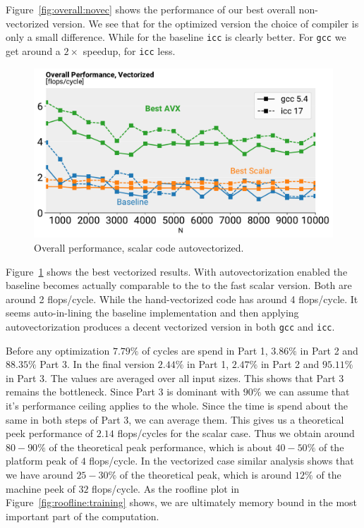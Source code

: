 \documentclass[letterpaper]{article}
\begin{document}
Figure~\ref{fig:overall:novec} shows the performance of our best overall non-vectorized version. We see that for the optimized version the choice of compiler is only a small difference. While for the baseline \texttt{icc} is clearly better. For \texttt{gcc} we get around a $2 \times$ speedup, for \texttt{icc} less.

\begin{figure}[h]
  \includegraphics[width=\linewidth]{images/overall_vec}
  \caption{Overall performance, scalar code autovectorized.}
   \label{fig:overall:vec}
      \vspace{-2mm}
\end{figure}

Figure~\ref{fig:overall:vec} shows the best vectorized results. With autovectorization enabled the baseline becomes actually comparable to the to the fast scalar version. Both are around 2 flops/cycle. While the hand-vectorized code has around 4 flops/cycle.
It seems auto-in-lining the baseline implementation and then applying autovectorization produces a decent vectorized version in both \texttt{gcc} and \texttt{icc}.

Before any optimization $7.79 \%$ of cycles are spend in Part 1, $3.86 \%$ in Part 2 and $88.35 \%$ Part 3. In the final version $2.44 \%$ in Part 1, $2.47 \%$ in Part 2 and $95.11 \%$ in Part 3. The values are averaged over all input sizes. This shows that Part 3 remains the bottleneck. Since Part 3 is dominant with $90 \%$ we can assume that it's performance ceiling applies to the whole. Since the time is spend about the same in both steps of Part 3, we can average them. This gives us a theoretical peek performance of $2.14$ flops/cycles for the scalar case. Thus we obtain around $80-90 \%$ of the theoretical peak performance, which is about $40-50\%$ of the platform peak of $4$ flops/cycle. In the vectorized case similar analysis shows that we have around $25-30\%$ of the theoretical peak, which is around $12 \%$ of the machine peek of $32$ flops/cycle. As the roofline plot in Figure~\ref{fig:roofline:training} shows, we are ultimately memory bound in the most important part of the computation.
\end{document}
